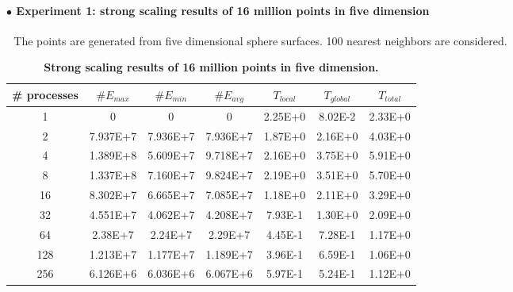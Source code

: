 \documentclass[12pt]{article}
\begin{document}
\paragraph{$\bullet$ Experiment 1: strong scaling results of 16 million points in five dimension}
$ $\newline
$ $\newline
\indent The points are generated from five dimensional sphere surfaces. 100 nearest neighbors are considered.
$ $\newline
\renewcommand{\arraystretch}{1.7}
\begin{table}[h]
\centering
    \caption{\textbf{Strong scaling results of 16 million points in five dimension.} }
    \label{16M5D}
\begin{tabular}{ccccccc}
    \hline %
\# processes  &$\# E_{max}$   &$\# E_{min}$ &$\# E_{avg}$  &$T_{local}$  &$T_{global}$  &$T_{total}$\\
\hline\hline
1 &0 &0 &0 &2.25E+0 &8.02E-2    &2.33E+0\\
2  &7.937E+7   &7.936E+7   &7.936E+7 &1.87E+0   &2.16E+0    &4.03E+0\\
4  &1.389E+8   &5.609E+7   &9.718E+7 &2.16E+0   &3.75E+0    &5.91E+0\\
8  &1.337E+8   &7.160E+7   &9.824E+7 &2.19E+0   &3.51E+0    &5.70E+0\\
16  &8.302E+7   &6.665E+7   &7.085E+7 &1.18E+0  &2.11E+0    &3.29E+0\\
32  &4.551E+7   &4.062E+7   &4.208E+7 &7.93E-1  &1.30E+0    &2.09E+0\\
64  &2.38E+7    &2.24E+7    &2.29E+7    &4.45E-1    &7.28E-1    &1.17E+0\\
128 &1.213E+7   &1.177E+7   &1.189E+7  &3.96E-1 &6.59E-1    &1.06E+0\\
256  &6.126E+6   &6.036E+6   &6.067E+6 &5.97E-1 &5.24E-1    &1.12E+0\\
\hline
    \end{tabular}
\end{table}
\end{document}
